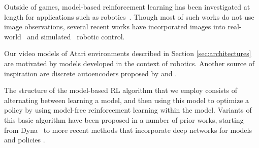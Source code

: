 Outside of games, model-based reinforcement learning has been investigated at length for applications such as robotics~\cite{deisenroth}. Though most of such works do not use image observations, several recent works
have incorporated images into real-world~\cite{deep_spatial, finn2016, sv2p, ebert, piergiovanni, paxton, rybkin-pertsch,ebert2018visual} and simulated~\cite{embed_to_control, hafner} robotic control. 

Our video models of Atari environments described in Section \ref{sec:architectures} are motivated by models developed in the context of robotics. Another source of inspiration are discrete autoencoders proposed by \citet{neural_discrete} and \citet{auto_discrete}.

The structure of the model-based RL algorithm that we employ consists of alternating between learning a model, and then using this model to optimize a policy by using model-free reinforcement learning within the model. Variants of this basic algorithm have been proposed in a number of prior works, starting from Dyna~\cite{dyna} to more recent methods that incorporate deep networks for models and policies
\cite{stochastic_value_gradients, model_based_value_estimation, uncertainty_driven_imagination, trpo_ensemble}.